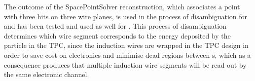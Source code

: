 The outcome of the SpacePointSolver reconstruction, which associates a \threed point with three hits on three wire planes, is used in the process of disambiguation for  and has been tested and used as well for . This process of disambiguation determines which wire segment corresponds to the energy deposited by the particle in the TPC, since the induction wires are wrapped in the  TPC design in order to save cost on electronics and minimise dead regions between s, which as a consequence produces that multiple induction wire segments will be read out by the same electronic channel.



